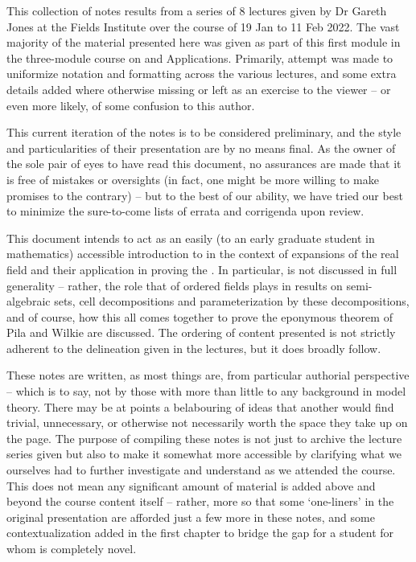 %
%

\preface

This collection of notes results from a series of 8 lectures given by Dr Gareth Jones at the Fields Institute over the course of 19 Jan to 11 Feb 2022. The vast majority of the material presented here was given as part of this first module in the three-module course on \omy and Applications. Primarily, attempt was made to uniformize notation and formatting across the various lectures, and some extra details added where otherwise missing or left as an exercise to the viewer -- or even more likely, of some confusion to this author.

This current iteration of the notes is to be considered preliminary, and the style and particularities of their presentation are by no means final. As the owner of the sole pair of eyes to have read this document, no assurances are made that it is free of mistakes or oversights (in fact, one might be more willing to make promises to the contrary) -- but to the best of our ability, we have tried our best to minimize the sure-to-come lists of errata and corrigenda upon review.
 
This document intends to act as an easily (to an early graduate student in mathematics) accessible introduction to \omy in the context of expansions of the real field and their application in proving the \pwt. In particular, \omy is not discussed in full generality -- rather, the role that \omy of ordered fields plays in results on semi-algebraic sets, cell decompositions and parameterization by these decompositions, and of course, how this all comes together to prove the eponymous theorem of Pila and Wilkie are discussed. The ordering of content presented is not strictly adherent to the delineation given in the lectures, but it does broadly follow.

These notes are written, as most things are, from particular authorial perspective -- which is to say, not by those with more than little to any background in model theory. There may be at points a belabouring of ideas that another would find trivial, unnecessary, or otherwise not necessarily worth the space they take up on the page. The purpose of compiling these notes is not just to archive the lecture series given but also to make it somewhat more accessible by clarifying what we ourselves had to further investigate and understand as we attended the course. This does not mean any significant amount of material is added above and beyond the course content itself -- rather, more so that some `one-liners' in the original presentation are afforded just a few more in these notes, and some contextualization added in the first chapter to bridge the gap for a student for whom \omy is completely novel.


